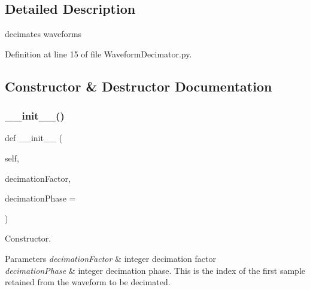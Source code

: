 \subsection{Detailed Description}
decimates waveforms 

Definition at line 15 of file Waveform\+Decimator.\+py.



\subsection{Constructor \& Destructor Documentation}
\mbox{\label{classSignalIntegrity_1_1TimeDomain_1_1Filters_1_1WaveformDecimator_1_1WaveformDecimator_a82d726dbf6a2595a4939e36f886dc24b}} 
\subsubsection{\texorpdfstring{\+\_\+\+\_\+init\+\_\+\+\_\+()}{\_\_init\_\_()}}
{\footnotesize\ttfamily def \+\_\+\+\_\+init\+\_\+\+\_\+ (\begin{DoxyParamCaption}\item[{}]{self,  }\item[{}]{decimation\+Factor,  }\item[{}]{decimation\+Phase = {} }\end{DoxyParamCaption})}



Constructor. 


\begin{DoxyParams}{Parameters}
{\em decimation\+Factor} & integer decimation factor \\
\hline
{\em decimation\+Phase} & integer decimation phase. This is the index of the first sample retained from the waveform to be decimated. \\
\hline
\end{DoxyParams}


